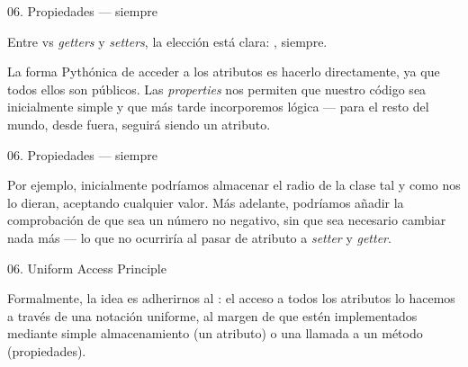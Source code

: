 \begin{frame}{06. Propiedades — siempre}
  \begin{alertblock}{}
    \Large
    \centering
     Entre  vs \textit{getters} y
     \textit{setters}, la elección está clara:
     , siempre.
  \end{alertblock}

  \begin{justify}
    \small
    La forma Pythónica de acceder a los atributos es hacerlo
    directamente, ya que todos ellos son públicos. Las
    \textit{properties} nos permiten que nuestro código sea
    inicialmente simple y que más tarde incorporemos lógica
     — para
    el resto del mundo, desde fuera, seguirá siendo un atributo.
  \end{justify}
\end{frame}

\begin{frame}{06. Propiedades — siempre}
  \begin{block}{}
    \centering
    Por ejemplo, inicialmente podríamos almacenar el radio de la clase
     tal y como nos lo dieran, aceptando cualquier
    valor. Más adelante, podríamos añadir la comprobación de que sea
    un número no negativo, sin que sea necesario cambiar nada más — lo
    que no ocurriría al pasar de atributo a \textit{setter} y
    \textit{getter}.
  \end{block}
\end{frame}

\begin{frame}{06. Uniform Access Principle}
  \begin{block}{}
    \centering
    Formalmente, la idea es adherirnos al : el acceso a todos los atributos lo hacemos a través
    de una notación uniforme, al margen de que estén implementados
    mediante simple almacenamiento (un atributo) o una llamada a un
    método (propiedades).
  \end{block}
\end{frame}

